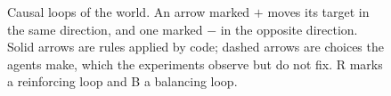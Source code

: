 \begin{figure}[!htbp]
\centering
\resizebox{0.7\linewidth}{!}{}
\caption{Causal loops of the world. An arrow marked $+$ moves its target in the same
direction, and one marked $-$ in the opposite direction. Solid arrows are rules applied
by code; dashed arrows are choices the agents make, which the experiments observe but do
not fix. R marks a reinforcing loop and B a balancing loop.}
\label{fig:system}
\end{figure}

